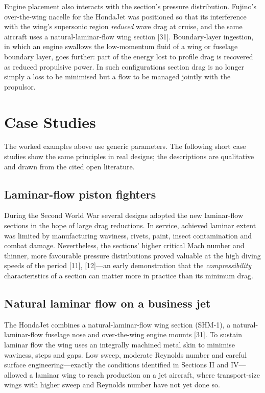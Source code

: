 \documentclass[10pt,a4paper,twocolumn]{article}
\begin{document}
Engine placement also interacts with the section's pressure
distribution. Fujino's over-the-wing nacelle for the HondaJet was
positioned so that its interference with the wing's supersonic region
\emph{reduced} wave drag at cruise, and the same aircraft uses a
natural-laminar-flow wing section {[}31{]}. Boundary-layer ingestion, in
which an engine swallows the low-momentum fluid of a wing or fuselage
boundary layer, goes further: part of the energy lost to profile drag is
recovered as reduced propulsive power. In such configurations section
drag is no longer simply a loss to be minimised but a flow to be managed
jointly with the propulsor.

\hypertarget{case-studies}{%
\section{Case Studies}\label{case-studies}}

The worked examples above use generic parameters. The following short
case studies show the same principles in real designs; the descriptions
are qualitative and drawn from the cited open literature.

\hypertarget{laminar-flow-piston-fighters}{%
\subsection{Laminar-flow piston
fighters}\label{laminar-flow-piston-fighters}}

During the Second World War several designs adopted the new laminar-flow
sections in the hope of large drag reductions. In service, achieved
laminar extent was limited by manufacturing waviness, rivets, paint,
insect contamination and combat damage. Nevertheless, the sections'
higher critical Mach number and thinner, more favourable pressure
distributions proved valuable at the high diving speeds of the period
{[}11{]}, {[}12{]}---an early demonstration that the
\emph{compressibility} characteristics of a section can matter more in
practice than its minimum drag.

\hypertarget{natural-laminar-flow-on-a-business-jet}{%
\subsection{Natural laminar flow on a business
jet}\label{natural-laminar-flow-on-a-business-jet}}

The HondaJet combines a natural-laminar-flow wing section (SHM-1), a
natural-laminar-flow fuselage nose and over-the-wing engine mounts
{[}31{]}. To sustain laminar flow the wing uses an integrally machined
metal skin to minimise waviness, steps and gaps. Low sweep, moderate
Reynolds number and careful surface engineering---exactly the conditions
identified in Sections II and IV---allowed a laminar wing to reach
production on a jet aircraft, where transport-size wings with higher
sweep and Reynolds number have not yet done so.
\end{document}
